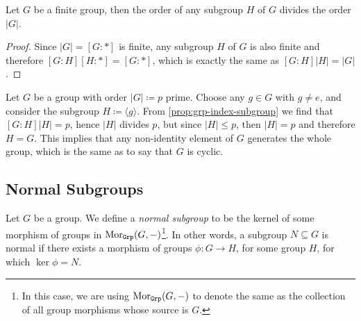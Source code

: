 \begin{corollary}
    \label{cor:order-subgroup-divides-order-group}
    Let \(G\) be a finite group, then the order of any subgroup \(H\) of \(G\)
    divides the order \(|G|\).
\end{corollary}

\begin{proof}
    Since \(|G| = [G \colon *]\) is finite, any subgroup \(H\) of \(G\) is also
    finite and therefore \([G \colon H] [H \colon *] = [G \colon *]\), which is
    exactly the same as \([G \colon H] |H| = |G|\).
\end{proof}

\begin{example}
    \label{exp:grp-prime-order-cyclic}
    Let \(G\) be a group with order \(|G| \coloneq p\) prime. Choose any \(g \in G\)
    with \(g \neq e\), and consider the subgroup \(H \coloneq \langle g
    \rangle\). From \cref{prop:grp-index-subgroup} we find that \([G \colon H] |H| =
    p\), hence \(|H|\) divides \(p\), but since \(|H| \leq p\), then \(|H| = p\) and
    therefore \(H = G\). This implies that any non-identity element of \(G\)
    generates the whole group, which is the same as to say that \(G\) is cyclic.
\end{example}

\subsection{Normal Subgroups}

\begin{definition}
    \label{def:normal-subgroup}
    Let \(G\) be a group. We define a \emph{normal subgroup} to be the kernel of
    some morphism of groups in \(\operatorname{Mor}_{{\texttt{Grp}}}(G, -)\)\footnote{In this case, we are
        using \(\operatorname{Mor}_{{\texttt{Grp}}}(G, -)\) to denote the same as the collection of all group
        morphisms whose source is \(G\).}. In other words, a subgroup \(N \subseteq G\)
    is normal if there exists a morphism of groups \(\phi: G \to H\), for some group
    \(H\), for which \(\ker \phi = N\).
\end{definition}

